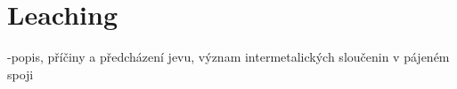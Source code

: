 \section{Leaching}
-popis, příčiny a předcházení jevu, význam intermetalických sloučenin v pájeném spoji